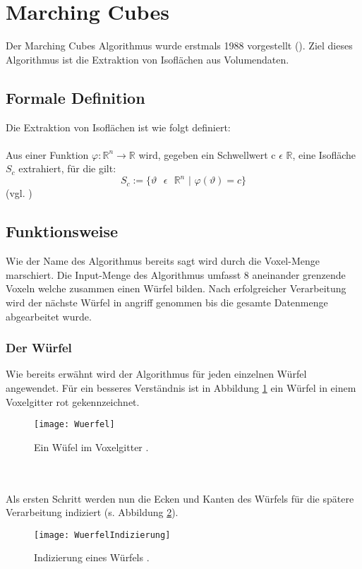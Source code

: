 \section{Marching Cubes}
Der Marching Cubes Algorithmus wurde erstmals 1988 vorgestellt (\cite{MCAlgo}). Ziel dieses Algorithmus ist die Extraktion von Isoflächen aus Volumendaten. 
\subsection{Formale Definition}
Die Extraktion von Isoflächen ist wie folgt definiert: 
\\\\
Aus einer Funktion $\varphi : \mathbb{R}^{n} \rightarrow \mathbb{R }$ wird, gegeben ein Schwellwert   c $\epsilon$ $ \mathbb{ R} $, eine
Isofläche $S_{c}$ extrahiert, für die gilt:
\begin{equation}
S_{c} := \{ \vartheta \text{ } \epsilon \text{ } \mathbb{R}^{n} \text{ | } \varphi(\vartheta) = c\}
\end{equation} 
(vgl. \cite{SeibtBak})

\subsection{Funktionsweise}
Wie der Name des Algorithmus bereits sagt wird durch die Voxel-Menge marschiert. Die Input-Menge des Algorithmus umfasst 8 aneinander grenzende Voxeln welche zusammen einen Würfel bilden. Nach erfolgreicher Verarbeitung wird der nächste Würfel in angriff genommen bis die gesamte Datenmenge abgearbeitet wurde. 
\subsubsection{Der Würfel}
Wie bereits erwähnt wird der Algorithmus für jeden einzelnen Würfel angewendet. Für ein besseres Verständnis ist in Abbildung \ref{fig:Wuerfel} ein Würfel in einem Voxelgitter rot gekennzeichnet. 
\begin{figure}
	\centering
	\texttt{[image: Wuerfel]}
	\caption{Ein Wüfel im Voxelgitter \cite{SeibtBak}.}
	\label{fig:Wuerfel}
\end{figure}
\\\\
Als ersten Schritt werden nun die Ecken und Kanten des Würfels für die spätere Verarbeitung indiziert (s. Abbildung \ref{fig:WuerfelIndizierung}).

\begin{figure}
	\centering
	\texttt{[image: WuerfelIndizierung]}
	\caption{Indizierung eines Würfels \cite{SeibtBak}.}
	\label{fig:WuerfelIndizierung}
\end{figure}



